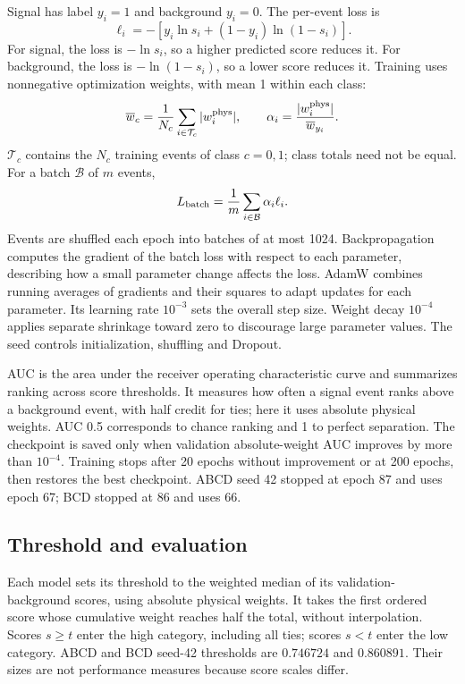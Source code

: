 \documentclass[11pt,a4paper]{article}
\begin{document}
Signal has label $y_i=1$ and background $y_i=0$. The per-event loss is
\[
 \ell_i=-\left[y_i\ln s_i+(1-y_i)\ln(1-s_i)\right].
\]
For signal, the loss is $-\ln s_i$, so a higher predicted score reduces it.
For background, the loss is $-\ln(1-s_i)$, so a lower score reduces it.
Training uses nonnegative optimization weights, with mean 1 within each class:
\[
 \overline w_c=\frac{1}{N_c}\sum_{i\in\mathcal T_c}|w_i^{\rm phys}|,
 \qquad
 \alpha_i=\frac{|w_i^{\rm phys}|}{\overline w_{y_i}}.
\]
$\mathcal T_c$ contains the $N_c$ training events of class $c=0,1$; class totals need not be equal.
For a batch $\mathcal B$ of $m$ events,
\[
 L_{\rm batch}=\frac{1}{m}\sum_{i\in\mathcal B}\alpha_i\ell_i.
\]
Events are shuffled each epoch into batches of at most 1024.
Backpropagation computes the gradient of the batch loss with respect to each parameter, describing how a small parameter change affects the loss.
AdamW combines running averages of gradients and their squares to adapt updates for each parameter.
Its learning rate $10^{-3}$ sets the overall step size. Weight decay $10^{-4}$ applies separate shrinkage toward zero to discourage large parameter values.
The seed controls initialization, shuffling and Dropout.

AUC is the area under the receiver operating characteristic curve and summarizes ranking across score thresholds.
It measures how often a signal event ranks above a background event, with half credit for ties; here it uses absolute physical weights.
AUC 0.5 corresponds to chance ranking and 1 to perfect separation.
The checkpoint is saved only when validation absolute-weight AUC improves by more than $10^{-4}$.
Training stops after 20 epochs without improvement or at 200 epochs, then restores the best checkpoint.
ABCD seed 42 stopped at epoch 87 and uses epoch 67; BCD stopped at 86 and uses 66.

\subsection{Threshold and evaluation}\label{sec:threshold}
Each model sets its threshold to the weighted median of its validation-background scores, using absolute physical weights.
It takes the first ordered score whose cumulative weight reaches half the total, without interpolation.
Scores $s\geq t$ enter the high category, including all ties; scores $s<t$ enter the low category.
ABCD and BCD seed-42 thresholds are $0.746724$ and $0.860891$. Their sizes are not performance measures because score scales differ.
\end{document}
